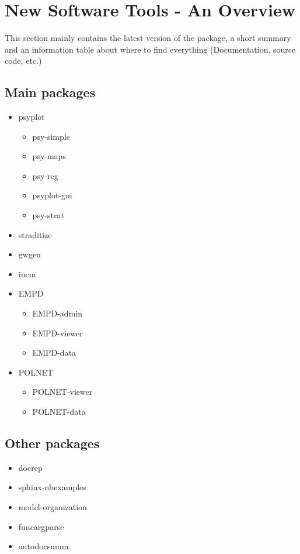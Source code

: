 
\chapter{New Software Tools - An Overview}

\label{chp:software}

This section mainly contains the latest version of the package, a short
summary and an information table about where to find everything
(Documentation, source code, etc.)


\section{Main packages} \label{sec:software-main}

\begin{itemize}
	\item psyplot
	\begin{itemize}
		\item psy-simple
		\item psy-maps
		\item psy-reg
		\item psyplot-gui
		\item psy-strat
	\end{itemize}
	\item straditize
	\item gwgen
	\item iucm
	\item EMPD
	\begin{itemize}
		\item EMPD-admin
		\item EMPD-viewer
		\item EMPD-data
	\end{itemize}
	\item POLNET
	\begin{itemize}
		\item POLNET-viewer
		\item POLNET-data
	\end{itemize}	
\end{itemize}


\section{Other packages} \label{sec:software-others}

\begin{itemize}
	\item docrep
	\item sphinx-nbexamples
	\item model-organization
	\item funcargparse
	\item autodocsumm
\end{itemize}